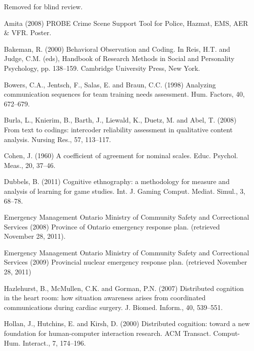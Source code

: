\documentclass[link]{IWCOMP}
\begin{document}
\ack Removed for blind review.

\makeatletter
\def\@biblabel#1{}
\makeatother


\begin{thebibliography}{99}

Amita (2008) PROBE Crime Scene Support Tool for Police, Hazmat, EMS, AER {\&} VFR. Poster.

Bakeman, R. (2000) Behavioral Observation
and Coding. In Reis, H.T. and Judge, C.M. (eds), Handbook
of Research Methods in Social and Personality Psychology,
pp. 138--159. Cambridge University Press, New York.

Bowers, C.A., Jentsch, F., Salas, E. and
Braun, C.C. (1998) Analyzing communication sequences for
team training needs assessment. Hum. Factors, 40, 672--679.

Burla, L., Knierim, B., Barth, J., Liewald,
K., Duetz, M. and Abel, T. (2008) From text to codings:
intercoder reliability assessment in qualitative content
analysis. Nursing Res., 57, 113--117.

Cohen, J. (1960) A coefficient of agreement
for nominal scales. Educ. Psychol. Meas., 20, 37--46.

Dubbels, B. (2011) Cognitive ethnography: a
methodology for measure and analysis of learning for game
studies. Int. J. Gaming Comput. Mediat. Simul., 3, 68--78.

Emergency Management Ontario Ministry of Community Safety and
Correctional Services (2008) Province of Ontario emergency
response plan. (retrieved November 28, 2011).

Emergency Management Ontario Ministry of Community Safety and
Correctional Services (2009) Provincial nuclear emergency
response plan. (retrieved November 28, 2011)

Hazlehurst, B., McMullen, C.K. and Gorman,
P.N. (2007) Distributed cognition in the heart room: how
situation awareness arises from coordinated communications
during cardiac surgery. J. Biomed. Inform., 40, 539--551.

Hollan, J., Hutchins, E. and Kirsh, D.
(2000) Distributed cognition: toward a new foundation for
human-computer interaction research. ACM Transact.
Comput-Hum. Interact., 7, 174--196.


\end{thebibliography}
\end{document}
